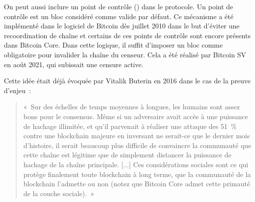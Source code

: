 On peut aussi inclure un point de contrôle () dans le protocole. Un point de contrôle est un bloc considéré comme valide par défaut. Ce mécanisme a été implémenté dans le logiciel de Bitcoin dès juillet 2010 dans le but d'éviter une recoordination de chaîne et certains de ces points de contrôle sont encore présents dans Bitcoin Core. Dans cette logique, il suffit d'imposer un bloc comme obligatoire pour invalider la chaîne du censeur. Cela a été réalisé par Bitcoin SV en août 2021, qui subissait une censure active.

Cette idée était déjà évoquée par Vitalik Buterin en 2016 dans le cas de la preuve d'enjeu~:

\begin{quote}
«~Sur des échelles de temps moyennes à longues, les humains sont assez bons pour le consensus. Même si un adversaire avait accès à une puissance de hachage illimitée, et qu'il parvenait à réaliser une attaque des 51~\% contre une blockchain majeure en inversant ne serait-ce que le dernier mois d'histoire, il serait beaucoup plus difficile de convaincre la communauté que cette chaîne est légitime que de simplement distancer la puissance de hachage de la chaîne principale. [...] Ces considérations sociales sont ce qui protège finalement toute blockchain à long terme, que la communauté de la blockchain l'admette ou non (notez que Bitcoin Core admet cette primauté de la couche sociale).~»
\end{quote}

